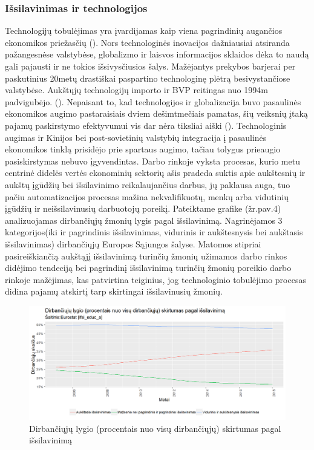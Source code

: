 \documentclass[12pt,a4paper,titlepage]{article}
\begin{document}
\subsubsection{Išsilavinimas ir technologijos}
Technologijų tobulėjimas yra įvardijamas kaip viena pagrindinių augančios ekonomikos priežasčių (\cite{jaumotte2013rising}). Nors technologinės inovacijos dažniausiai atsiranda pažangesnėse valstybėse, globalizmo ir laisvos informacijos sklaidos dėka to naudą gali pajausti ir ne tokios išsivysčiusios šalys. Mažėjantys prekybos barjerai per paskutinius 20metų drastiškai paspartino technologinę plėtrą besivystančiose valstybėse. Aukštųjų technologijų importo ir BVP reitingas nuo 1994m padvigubėjo. (\cite{pena2008global}). Nepaisant to, kad technologijos ir globalizacija buvo pasaulinės ekonomikos augimo pastaraisiais dviem dešimtmečiais pamatas, šių veiksnių įtaką pajamų paskirstymo efektyvumui vis dar nėra tiksliai aiški (\cite{jaumotte2013rising}). Technologinis augimas ir Kinijos bei post-sovietinių valstybių integracija į pasaulinės ekonomikos tinklą prisidėjo prie spartaus augimo, tačiau tolygus prieaugio pasiskirstymas nebuvo įgyvendintas. Darbo rinkoje vyksta procesas, kurio metu centrinė didelės vertės ekonominių sektorių ašis pradeda suktis apie aukštesnių ir aukštų įgūdžių bei išsilavinimo reikalaujančius darbus, jų paklausa auga, tuo pačiu automatizacijos procesas mažina nekvalifikuotų, menkų arba vidutinių įgūdžių ir neišsilavinusių darbuotojų poreikį.
Pateiktame grafike (žr.pav.4) analizuojamas dirbančiųjų žmonių lygis pagal išsilavinimą. Nagrinėjamos 3 kategorijos(iki ir pagrindinis išsilavinimas, vidurinis ir aukštesnysis bei aukštasis išsilavinimas) dirbančiųjų Europos Sąjungos šalyse. Matomos stipriai pasireiškiančią aukštąjį išsilavinimą turinčių žmonių užimamos darbo rinkos didėjimo tendeciją bei pagrindinį išsilavinimą turinčių žmonių poreikio darbo rinkoje mažėjimas, kas patvirtina teiginius, jog technologinio tobulėjimo procesas didina pajamų atskirtį tarp skirtingai išsilavinusių žmonių.
\begin{figure}[H]
\includegraphics[scale=0.7]{workerseducation.png}
\caption{Dirbančiųjų lygio (procentais nuo visų dirbančiųjų) skirtumas pagal išsilavinimą}
\end{figure}
\end{document}
